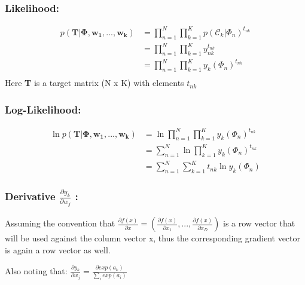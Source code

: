 \documentclass[a4paper]{article}
\begin{document}
\subsubsection*{Likelihood:}

\begin{align*}
    p(\pmb{T}|\pmb{\Phi, w_{1},...,w_{k}}) &= \prod_{n=1}^{N} \prod_{k=1}^{K} p(\pmb{\mathcal{C}}_{k}|\Phi_{n})^{t_{nk}}\\
    &= \prod_{n=1}^{N} \prod_{k=1}^{K} y_{nk}^{t_{nk}}\\
    &= \prod_{n=1}^{N} \prod_{k=1}^{K} y_{k}(\Phi_{n})^{t_{nk}}\\
\end{align*}{}
Here \textbf{T} is a target matrix (N x K) with elements $t_{nk}$

\subsubsection*{Log-Likelihood:}
\begin{align*}
    \ln{p(\pmb{T}|\pmb{\Phi, w_{1},...,w_{k}})} &= \ln{\prod_{n=1}^{N} \prod_{k=1}^{K} y_{k}(\Phi_{n})^{t_{nk}}}\\
    &= \sum_{n=1}^{N}\ln{\prod_{k=1}^{K} y_{k}(\Phi_{n})^{t_{nk}}} \\
    &= \sum_{n=1}^{N} \sum_{k=1}^{K}t_{nk}\ln{y_{k}(\Phi_{n})}
\end{align*}{}


\subsubsection*{Derivative $\frac{\partial y_{k}}{\partial w_{j}}$ :}

Assuming the convention that $ \frac{\partial f(x)}{\partial x} = (\frac{\partial f(x)}{\partial x_{1}},...,\frac{\partial f(x)}{\partial x_{D}})$ is a row vector that will be used against the column vector  x, thus the corresponding gradient vector is again a row vector as well.

Also noting that:
$\frac{\partial y_{k}}{\partial w_{j}} = \frac{\partial exp(a_k)}{\sum_{i}exp(a_{i})}$
\end{document}

